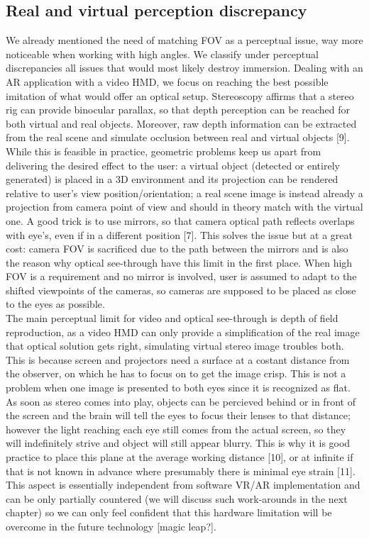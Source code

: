 \subsection{Real and virtual perception discrepancy}
We already mentioned the need of matching FOV as a perceptual issue, way more noticeable when working with high angles. We classify under perceptual discrepancies all issues that would most likely destroy immersion. Dealing with an AR application with a video HMD, we focus on reaching the best possible imitation of what would offer an optical setup. Stereoscopy affirms that a stereo rig can provide binocular parallax, so that depth perception can be reached for both virtual and real objects. Moreover, raw depth information can be extracted from the real scene and simulate occlusion between real and virtual objects [9].\\
While this is feasible in practice, geometric problems keep us apart from delivering the desired effect to the user: a virtual object (detected or entirely generated) is placed in a 3D environment and its projection can be rendered relative to user’s view position/orientation; a real scene image is instead already a projection from camera point of view and should in theory match with the virtual one. A good trick is to use mirrors, so that camera optical path reflects overlaps with eye’s, even if in a different position [7]. This solves the issue but at a great cost: camera FOV is sacrificed due to the path between the mirrors and is also the reason why optical see-through have this limit in the first place. When high FOV is a requirement and no mirror is involved, user is assumed to adapt to the shifted viewpoints of the cameras, so cameras are supposed to be placed as close to the eyes as possible.\\
The main perceptual limit for video and optical see-through is depth of field reproduction, as a video HMD can only provide a simplification of the real image that optical solution gets right, simulating virtual stereo image troubles both. This is because screen and projectors need a surface at a costant distance from the observer, on which he has to focus on to get the image crisp. This is not a problem when one image is presented to both eyes since it is recognized as flat. As soon as stereo comes into play, objects can be percieved behind or in front of the screen and the brain will tell the eyes to focus their lenses to that distance; however the light reaching each eye still comes from the actual screen, so they will indefinitely strive and object will still appear blurry. This is why it is good practice to place this plane at the average working distance [10], or at infinite if that is not known in advance where presumably there is minimal eye strain [11]. This aspect is essentially independent from software VR/AR implementation and can be only partially countered (we will discuss such work-arounds in the next chapter) so we can only feel confident that this hardware limitation will be overcome in the future technology [magic leap?].\\
